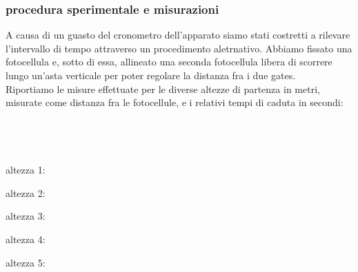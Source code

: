 \documentclass[a4paper]{article}
\theoremstyle{definition}
\begin{document}
\subsubsection*{procedura sperimentale e misurazioni}
A causa di un guasto del cronometro dell'apparato siamo stati costretti a rilevare l'intervallo di tempo attraverso un procedimento aletrnativo. Abbiamo fissato una fotocellula e, sotto di essa, allineato una seconda fotocellula libera di scorrere lungo un'asta verticale per poter regolare la distanza fra i due gates.\\

\noindent Riportiamo le misure effettuate per le diverse altezze di partenza in metri, misurate come distanza fra le fotocellule, e i relativi tempi di caduta in secondi:\\\\\\\\\\

\noindent altezza 1:

\begin{table}[!htbp]
	\centering
	
\end{table}

\begin{table}[!htbp]
	\centering
	
\end{table}

\noindent altezza 2:

\begin{table}[!htbp]
	\centering
	
\end{table}

\begin{table}[!htbp]
	\centering
	
\end{table}
\noindent altezza 3:

\begin{table}[!htbp]
	\centering
	
\end{table}
\begin{table}[!htbp]
	\centering
	
\end{table}
\noindent altezza 4:

\begin{table}[!htbp]
	\centering
	
\end{table}
\begin{table}[!htbp]
	\centering
	
\end{table}
\noindent altezza 5:	
\end{document}
